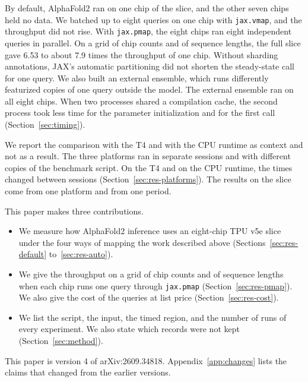 By default, AlphaFold2 ran on one chip of the slice, and the other seven chips held no data.
We batched up to eight queries on one chip with \texttt{jax.vmap}, and the throughput did not rise.
With \texttt{jax.pmap}, the eight chips ran eight independent queries in parallel.
On a grid of chip counts and of sequence lengths, the full slice gave 6.53 to about 7.9 times the throughput of one chip. %
Without sharding annotations, JAX's automatic partitioning did not shorten the steady-state call for one query. We also
built an external ensemble, which runs differently featurized copies of one query outside the model. The external
ensemble ran on all eight chips.
When two processes shared a compilation cache, the second process took less time for the parameter initialization and for the first call (Section~\ref{sec:timing}).

We report the comparison with the T4 and with the CPU runtime as context and not as a result. The three platforms ran
in separate sessions and with different copies of the benchmark script. On the T4 and on the CPU runtime, the times
changed between sessions (Section~\ref{sec:res-platforms}). The results on the slice come from one platform and from
one period.

\keepwithlist
This paper makes three contributions.
\begin{itemize}
\item We measure how AlphaFold2 inference uses an eight-chip TPU v5e slice under the four ways of mapping the work
described above (Sections~\ref{sec:res-default} to~\ref{sec:res-auto}).
\item We give the throughput on a grid of chip counts and of sequence lengths when each chip runs one query through
\texttt{jax.pmap} (Section~\ref{sec:res-pmap}). We also give the cost of the queries at list price
(Section~\ref{sec:res-cost}).
\item We list the script, the input, the timed region, and the number of runs of every experiment. We also state
which records were not kept (Section~\ref{sec:method}).
\end{itemize}

This paper is version 4 of arXiv:2609.34818.
\ifappendix Appendix~\ref{app:changes} lists the claims that changed from the earlier versions.\fi
